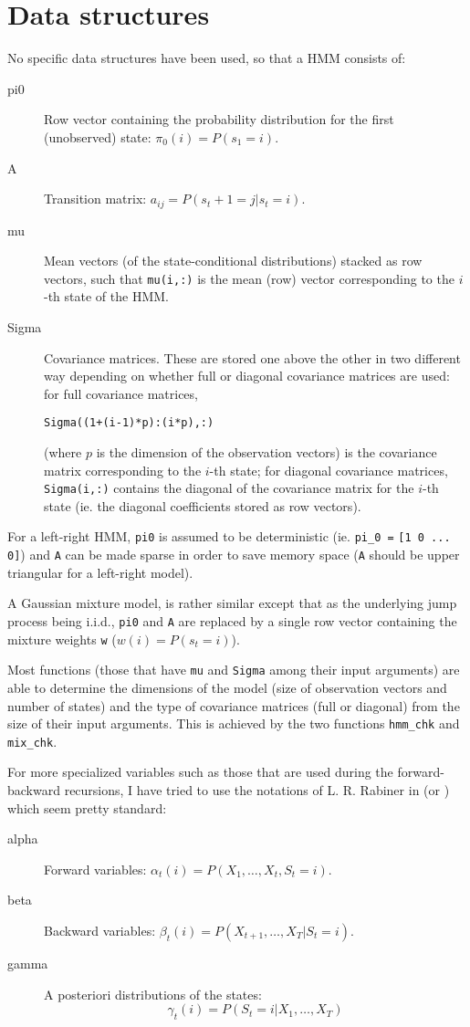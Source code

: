 \documentclass[a4paper,11pt]{article}
\begin{document}
\section{Data structures}
No specific data structures have been used, so that a HMM consists of:
\begin{description}
  \item [pi0] Row vector containing the probability distribution for the first (unobserved) state: $\pi_0(i) = P(s_1 = i)$.
  \item [A] Transition matrix: $a_{ij} = P(s_t+1 = j | s_t = i)$.
  \item [mu] Mean vectors (of the state-conditional distributions) stacked as row vectors, such that \verb+mu(i,:)+ is the mean (row) vector corresponding to the $i$-th state of the HMM.
  \item [Sigma] Covariance matrices. These are stored one above the other in two different way depending on whether full or diagonal covariance matrices are used: for full covariance matrices,
\begin{verbatim}
Sigma((1+(i-1)*p):(i*p),:)
\end{verbatim}
(where $p$ is the dimension of the observation vectors) is the covariance matrix corresponding to the $i$-th state; for diagonal covariance matrices, \verb+Sigma(i,:)+ contains the diagonal of the covariance matrix for the $i$-th state (ie. the diagonal coefficients stored as row vectors).
\end{description}
For a left-right HMM, \verb+pi0+ is assumed to be deterministic (ie. \verb+pi_0 =+ \verb+[1 0 ... 0]+) and \verb+A+ can be made sparse in order to save memory space (\verb+A+ should be upper triangular for a left-right model).

A Gaussian mixture model, is rather similar except that as the underlying jump process being i.i.d., \verb+pi0+ and \verb+A+ are replaced by a single row vector containing the mixture weights \verb+w+ ($w(i) = P(s_t = i)$).

Most functions (those that have \verb+mu+ and \verb+Sigma+ among their input arguments) are able to determine the dimensions of the model (size of observation vectors and number of states) and the type of covariance matrices (full or diagonal) from the size of their input arguments. This is achieved by the two functions \verb+hmm_chk+ and \verb+mix_chk+.

For more specialized variables such as those that are used during the forward-backward recursions, I have tried to use the notations of L. R. Rabiner in \cite{Rabiner:HMM} (or \cite{Rabiner:SpeechRec}) which seem pretty standard:
\begin{description}
\item [alpha] Forward variables: $\alpha_{t}(i) = P(X_1, \ldots, X_t, S_t = i)$.
\item [beta] Backward variables: $\beta_{t}(i) = P(X_{t+1}, \ldots, X_T | S_t = i)$.
\item [gamma] A posteriori distributions of the states:
\[
\gamma_{t}(i) = P(S_t = i | X_{1}, \ldots, X_T)
\]
\end{description}
\end{document}

